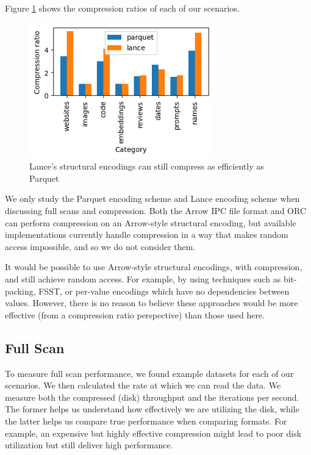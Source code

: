 \documentclass[sigconf, nonacm]{acmart}
\begin{document}
Figure \ref{fig:uncompression} shows the compression ratios of each of our scenarios.

\begin{figure}[h]
    \centering
    \includegraphics[width=8cm]{figures/uncompression-ratios.png}
    \caption{Lance's structural encodings can still compress as efficiently as Parquet}
    \label{fig:uncompression}
\end{figure}

We only study the Parquet encoding scheme and Lance encoding scheme when discussing full scans and compression.  Both the Arrow IPC file format and ORC can perform compression on an Arrow-style structural encoding, but available implementations currently handle compression in a way that makes random access impossible, and so we do not consider them.

It would be possible to use Arrow-style structural encodings, with compression, and still achieve random access.  For example, by using techniques such as bit-packing, FSST, or per-value encodings which have no dependencies between values.  However, there is no reason to believe these approaches would be more effective (from a compression ratio perspective) than those used here.

\subsection{Full Scan} \label{full-scan-experiments}

To measure full scan performance, we found example datasets for each of our scenarios.  We then calculated the rate at which we can read the data.  We measure both the compressed (disk) throughput and the iterations per second.  The former helps us understand how effectively we are utilizing the disk, while the latter helps us compare true performance when comparing formats.  For example, an expensive but highly effective compression might lead to poor disk utilization but still deliver high performance.
\end{document}
